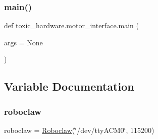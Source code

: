 \subsubsection{\texorpdfstring{main()}{main()}}
{\footnotesize\ttfamily def toxic\+\_\+hardware.\+motor\+\_\+interface.\+main (\begin{DoxyParamCaption}\item[{}]{args = {\ttfamily None} }\end{DoxyParamCaption})}



\subsection{Variable Documentation}
\mbox{\label{namespacetoxic__hardware_1_1motor__interface_a257386444c3afd4030922ffb828f85fe}} 
\subsubsection{\texorpdfstring{roboclaw}{roboclaw}}
{\footnotesize\ttfamily roboclaw = \mbox{\hyperlink{classtoxic__hardware_1_1roboclaw__3_1_1Roboclaw}{Roboclaw}}(\char`\"{}/dev/tty\+A\+C\+M0\char`\"{}, 115200)}

